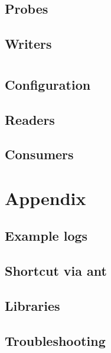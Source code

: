 \documentclass[a4paper, oneside, 11pt]{scrartcl}
\begin{document}
\subsection{Probes}
\subsection{Writers}

\section{\KiekerAnalysis}
\subsection{Configuration}
\subsection{Readers}
\subsection{Consumers}

\section{Appendix}
\subsection{Example logs}
\subsection{Shortcut via ant}
\subsection{Libraries}

\subsection{Troubleshooting}
\end{document}
